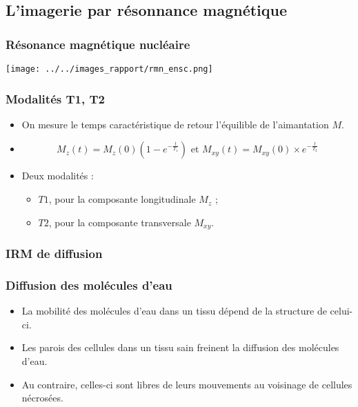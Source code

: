 \subsection{L'imagerie par r\'esonnance magn\'etique}



\begin{frame}
\frametitle{R\'esonance magn\'etique nucl\'eaire}
\texttt{[image: ../../images\_rapport/rmn\_ensc.png]}
\end{frame}

\begin{frame}
\frametitle{Modalit\'es T1, T2}
\begin{itemize}
\item<+-> On mesure le temps caract\'eristique de retour  l'\'equilible de l'aimantation $M$.
\item<+-> \[M_z(t)=M_z(0)\left(1-e^{-\frac{t}{T_1}}\right)\text{ et }M_{xy}(t)=M_{xy}(0)\times e^{-\frac{t}{T_2}}\]
\item<+-> Deux modalit\'es :
\begin{itemize}
\item<+-> $T1$, pour la composante longitudinale $M_z$ ;
\item<+-> $T2$, pour la composante transversale $M_{xy}$.
\end{itemize}
\end{itemize}
\end{frame}

\subsubsection{IRM de diffusion}
\begin{frame}
\frametitle{Diffusion des mol\'ecules d'eau}
\begin{itemize}
\item<+-> La mobilit\'e des mol\'ecules d'eau dans un tissu d\'epend de la structure de celui-ci.
\item<+-> Les parois des cellules dans un tissu sain freinent la diffusion des mol\'ecules d'eau.
\item<+-> Au contraire, celles-ci sont libres de leurs mouvements au voisinage de cellules n\'ecros\'ees.
\end{itemize}
\end{frame}

